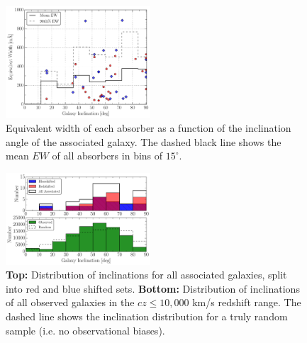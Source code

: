 \documentclass[iop]{emulateapj-rtx4}
\begin{document}
%


\begin{figure}[h!]
        \centering
        \includegraphics[width=0.48\textwidth]{W(fancy_inc)_mean_90_hist.pdf}
        \caption{\small{Equivalent width of each absorber as a function of the inclination angle of the associated galaxy. The dashed black line shows the mean $EW$ of all absorbers in bins of $15^{\circ}$.}}
        \label{ew_vs_inclination}
        \vspace{2pt}
\end{figure}

\begin{figure}[h!]
        \centering
        \includegraphics[width=0.48\textwidth]{hist(fancy_inclination)_red_blue_all_random.pdf}
        \caption{\small{\textbf{Top: }Distribution of inclinations for all associated galaxies, split into red and blue shifted sets. \textbf{Bottom:} Distribution of inclinations of all observed galaxies in the $cz \leq 10,000$ km/s redshift range. The dashed line shows the inclination distribution for a truly random sample (i.e. no observational biases).}}
        \label{hist_inc}
        \vspace{2pt}
\end{figure}
\end{document}
